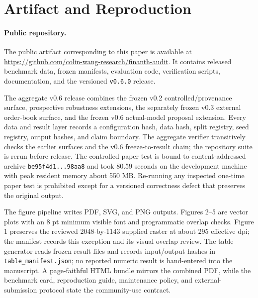 \section{Artifact and Reproduction}
\paragraph{Public repository.}
The public artifact corresponding to this paper is available at
\url{https://github.com/colin-wang-research/finanth-audit}. It contains
released benchmark data, frozen manifests, evaluation code, verification
scripts, documentation, and the versioned \texttt{v0.6.0} release.

The aggregate v0.6 release combines the frozen v0.2 controlled/provenance
surface, prospective robustness extensions, the separately frozen v0.3
external order-book surface, and the frozen v0.6 actual-model proposal
extension. Every data and result layer records a configuration hash, data hash,
split registry, seed registry, output hashes, and claim boundary. The aggregate
verifier transitively checks the earlier surfaces and the v0.6 freeze-to-result
chain; the repository suite is rerun before release. The controlled paper
test is bound to content-addressed archive \texttt{be95f4d1...98aa8} and took
80.59 seconds on the development machine with peak resident memory about
550 MB. Re-running any inspected one-time paper test is prohibited except for a
versioned correctness defect that preserves the original output.

\begin{table}[h]
  \caption{\textbf{FinAuth-Audit treats benchmark validity as the evaluation object.} ``Rules'' denotes explicit comparison of execution or decision rules; the remaining columns denote validity audits, not generic safety features.}
  \label{tab:benchmark_comparison}
  \centering
  \benchmarktableformat
  
\end{table}

\begin{table}[h]
  \caption{Artifact components and machine-checkable release paths.}
  \label{tab:artifact_checklist}
  \centering
  \benchmarktableformat
  
\end{table}

The figure pipeline writes PDF, SVG, and PNG outputs. Figures 2--5 are vector plots with an 8 pt minimum visible font and programmatic overlap checks. Figure 1 preserves the reviewed 2048-by-1143 supplied raster at about 295 effective dpi; the manifest records this exception and its visual overlap review. The table generator reads frozen result files and records input/output hashes in \texttt{table\_manifest.json}; no reported numeric result is hand-entered into the manuscript. A page-faithful HTML bundle mirrors the combined PDF, while the benchmark card, reproduction guide, maintenance policy, and external-submission protocol state the community-use contract.

